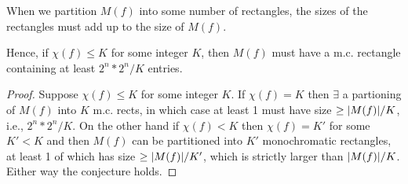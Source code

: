 When we partition $M(f)$ into some number of rectangles,
	the sizes of the rectangles must add up to the size of $M(f)$.
\pause
\medskip

Hence, if $\chi(f) \leq K$ for some integer $K$,
	then $M(f)$ must have a m.c. rectangle containing at least $2^n * 2^n / K$ entries.
\pause
\begin{proof}
Suppose $\chi(f) \leq K$ for some integer $K$.
\pause
If $\chi(f) = K$ then $\exists$ a partioning of $M(f)$ into $K$ m.c. rects, in which case at least 1 must have size $\geq \lvert M(f)\rvert / K$, i.e., $2^n * 2^n / K$.  
\pause
On the other hand if $\chi(f) < K$ then $\chi(f) = K'$ for some $K' < K$ and then $M(f)$ can be partitioned into $K'$ monochromatic rectangles, at least 1 of which has size $\geq \lvert M(f)\rvert / K'$, which is strictly larger than $\lvert M(f)\rvert / K$.
\pause
Either way the conjecture holds.
\end{proof}
